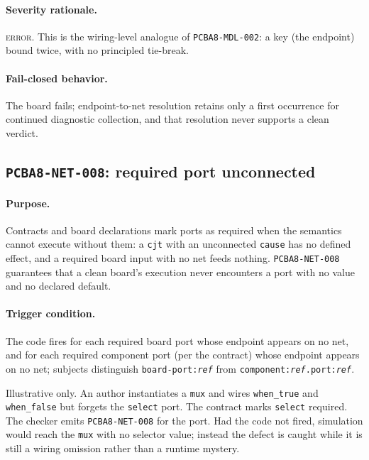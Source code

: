 \paragraph{Severity rationale.} \textsc{error}. This is the wiring-level analogue of \texttt{PCBA8-MDL-002}: a key (the endpoint) bound twice, with no principled tie-break.

\paragraph{Fail-closed behavior.} The board fails; endpoint-to-net resolution retains only a first occurrence for continued diagnostic collection, and that resolution never supports a clean verdict.

\subsection{\texttt{PCBA8-NET-008}: required port unconnected}\label{ch07:sub:net008}

\paragraph{Purpose.} Contracts and board declarations mark ports as required when the semantics cannot execute without them: a \texttt{cjt} with an unconnected \texttt{cause} has no defined effect, and a required board input with no net feeds nothing. \texttt{PCBA8-NET-008} guarantees that a clean board's execution never encounters a port with no value and no declared default.

\paragraph{Trigger condition.} The code fires for each required board port whose endpoint appears on no net, and for each required component port (per the contract) whose endpoint appears on no net; subjects distinguish \texttt{board-port:\emph{ref}} from \texttt{component:\emph{ref}.port:\emph{ref}}.

\begin{example}\label{ch07:ex:net008}
Illustrative only. An author instantiates a \texttt{mux} and wires \texttt{when\_true} and \texttt{when\_false} but forgets the \texttt{select} port. The contract marks \texttt{select} required. The checker emits \texttt{PCBA8-NET-008} for the port. Had the code not fired, simulation would reach the \texttt{mux} with no selector value; instead the defect is caught while it is still a wiring omission rather than a runtime mystery.
\end{example}

